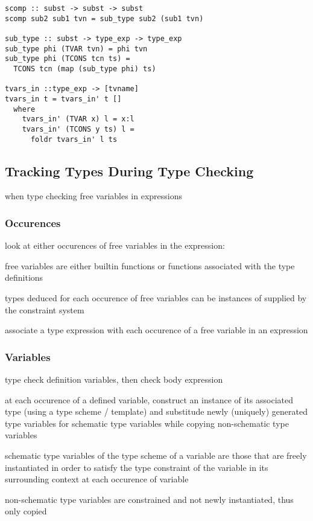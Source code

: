 \documentclass[8pt]{extarticle}
\begin{document}
\begin{multicols*}{2}
\begin{verbatim}
scomp :: subst -> subst -> subst
scomp sub2 sub1 tvn = sub_type sub2 (sub1 tvn)

sub_type :: subst -> type_exp -> type_exp
sub_type phi (TVAR tvn) = phi tvn
sub_type phi (TCONS tcn ts) =
  TCONS tcn (map (sub_type phi) ts)

tvars_in ::type_exp -> [tvname]
tvars_in t = tvars_in' t []
  where
    tvars_in' (TVAR x) l = x:l
    tvars_in' (TCONS y ts) l =
      foldr tvars_in' l ts
\end{verbatim}

\vfill\null
\columnbreak

\subsection{Tracking Types During Type Checking}

when type checking free variables in expressions

\subsubsection{Occurences}
look at either occurences of free variables in the expression:

free variables are either builtin functions or functions associated with the type definitions

types deduced for each occurence of free variables can be instances of supplied by the constraint system

associate a type expression with each occurence of a free variable in an expression

\subsubsection{Variables}
type check definition variables, then check body expression

at each occurence of a defined variable, construct an instance of its associated type (using a type scheme / template) and substitude newly (uniquely) generated type variables for schematic type variables while copying non-schematic type variables

schematic type variables of the type scheme of a variable are those that are freely instantiated in order to satisfy the type constraint of the variable in its surrounding context at each occurence of variable

non-schematic type variables are constrained and not newly instantiated, thus only copied


\end{multicols*}
\end{document}
